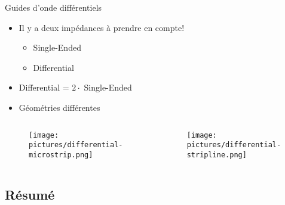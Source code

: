 \begin{frame}{Guides d'onde différentiels}

    \begin{itemize}
        \item Il y a deux impédances à prendre en compte!
        \begin{itemize}
            \item Single-Ended
            \item Differential
        \end{itemize}
        \item Differential = $2 \cdot$ Single-Ended
        \item Géométries différentes
    \end{itemize}

    \begin{columns}
        \begin{column}{0.5\textwidth}
            \begin{center}
                \begin{figure}
                    \centering
                    \texttt{[image: pictures/differential-microstrip.png]}
                \end{figure}
            \end{center}
        \end{column}

        \begin{column}{0.5\textwidth}
            \begin{center}
                \begin{figure}
                    \centering
                    \texttt{[image: pictures/differential-stripline.png]}
                \end{figure}
            \end{center}
        \end{column}
    \end{columns}
\end{frame}

\subsection{Résumé}

